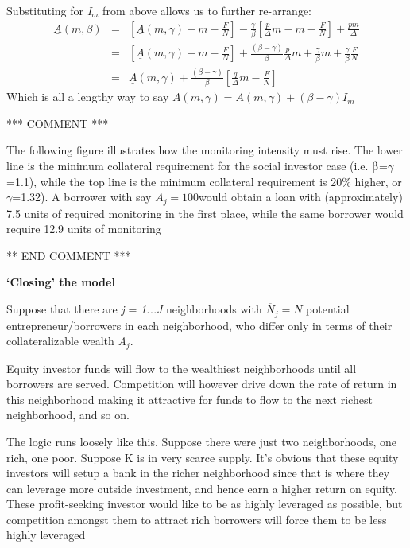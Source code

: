 \documentclass{article} %
\begin{document}
\noindent Substituting for \textit{I${}_{m}$} from above allows us to further re-arrange:
\[\begin{array}{rcl} {\underline{A}(m,\beta )} & {=} & {\left[\underline{A}(m,\gamma )-m-\frac{F}{N} \right]-\frac{\gamma }{\beta } \left[\frac{p}{\Delta } m-m-\frac{F}{N} \right]+\frac{pm}{\Delta } } \\ {} & {=} & {\left[\underline{A}(m,\gamma )-m-\frac{F}{N} \right]+\frac{(\beta -\gamma )}{\beta } \frac{p}{\Delta } m+\frac{\gamma }{\beta } m+\frac{\gamma }{\beta } \frac{F}{N} } \\ {} & {=} & {\underline{A}(m,\gamma )+\frac{(\beta -\gamma )}{\beta } \left[\frac{q}{\Delta } m-\frac{F}{N} \right]} \end{array}\] 
Which is all a lengthy way to say $\underline{A}(m,\gamma )=\underline{A}(m,\gamma )+(\beta -\gamma )I_{m} $

\noindent **** COMMENT ***

\noindent The following figure illustrates how the monitoring intensity must rise. The lower line is the minimum collateral requirement for the social investor case (i.e. $\betaup$=$\gamma$=1.1), while the top line is the minimum collateral requirement is 20\% higher, or $\gamma$=1.32).  A borrower with say $A_{j} =100$would obtain a loan with (approximately) 7.5 units of required monitoring in the first place, while the same borrower would require 12.9 units of monitoring   

\noindent 

\noindent 

\noindent *** END COMMENT ***

\noindent \textbf{`Closing' the model }

\noindent Suppose that there are \textit{j} = \textit{1...J} neighborhoods with $\overline{N}_{j} =N$ potential entrepreneur/borrowers in each neighborhood, who differ only in terms of their collateralizable wealth \textit{A}${}_{j}$.

\noindent Equity investor funds will flow to the wealthiest neighborhoods until all borrowers are served. Competition will however drive down the rate of return in this neighborhood making it attractive for funds to flow to the next richest neighborhood, and so on.

\noindent The logic runs loosely like this.  Suppose there were just two neighborhoods, one rich, one poor.  Suppose K is in very scarce supply.  It's obvious that these equity investors will setup a bank in the richer neighborhood since that is where they can leverage more outside investment, and hence earn a higher return on equity.  These profit-seeking investor would like to be as highly leveraged as possible, but competition amongst them to attract rich borrowers will force them to be less highly leveraged    
\end{document}
